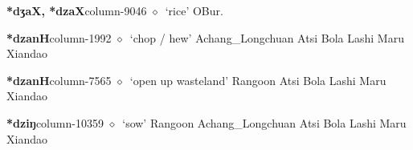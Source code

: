   \item {\footnotesize \textbf{*dʒaX, *dzaX}}{\tiny column-9046}
         $\diamond$~`rice'
         OBur. 
  \item {\footnotesize \textbf{*dzanH}}{\tiny column-1992}
         $\diamond$~`chop / hew'
         Achang\_Longchuan 
\hspace{1ex}
         Atsi 
\hspace{1ex}
         Bola 
\hspace{1ex}
         Lashi 
\hspace{1ex}
         Maru 
\hspace{1ex}
         Xiandao 
  \item {\footnotesize \textbf{*dzanH}}{\tiny column-7565}
         $\diamond$~`open up wasteland'
         Rangoon 
\hspace{1ex}
         Atsi 
\hspace{1ex}
         Bola 
\hspace{1ex}
         Lashi 
\hspace{1ex}
         Maru 
\hspace{1ex}
         Xiandao 
  \item {\footnotesize \textbf{*dziŋ}}{\tiny column-10359}
         $\diamond$~`sow'
         Rangoon 
\hspace{1ex}
         Achang\_Longchuan 
\hspace{1ex}
         Atsi 
\hspace{1ex}
         Bola 
\hspace{1ex}
         Lashi 
\hspace{1ex}
         Maru 
\hspace{1ex}
         Xiandao 
